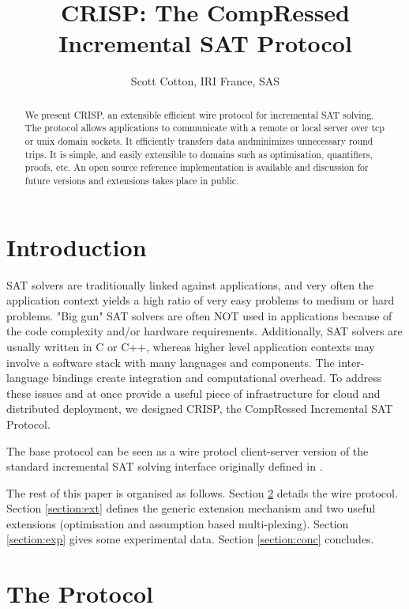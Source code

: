 \documentclass{article}
\begin{document}

\title{CRISP: The CompRessed Incremental SAT Protocol}
\author{Scott Cotton, IRI France, SAS}
\begin{abstract}
We present CRISP, an extensible efficient wire protocol for incremental SAT solving.
The protocol allows applications to communicate with a remote or local server over
tcp or unix domain sockets.  It efficiently transfers data andminimizes unnecessary round
trips.  It is simple, and easily extensible to domains such as optimisation, quantifiers,
proofs, etc.  An open source reference implementation is available and discussion for
future versions and extensions takes place in public.

\end{abstract}
\maketitle
\section{Introduction}
SAT solvers are traditionally linked against applications, and very often the 
application context yields a high ratio of very easy problems to medium or
hard problems.  "Big gun" SAT solvers are often NOT used in applications because
of the code complexity and/or hardware requirements.  Additionally, SAT solvers
are usually written in C or C++, whereas higher level application contexts may involve
a software stack with many languages and components.  The inter-language bindings
create integration and computational overhead.  To address these issues and 
at once provide a useful piece of infrastructure for cloud and distributed deployment,
we designed CRISP, the CompRessed Incremental SAT Protocol. 

The base protocol can be seen as a wire protocl client-server version of the
standard incremental SAT solving interface originally defined in
\cite{DBLP:journals/entcs/EenS03}.

The rest of this paper is organised as follows.  Section \ref{section:protocol}
details the wire protocol.  Section \ref{section:ext} defines the generic
extension mechanism and two useful extensions (optimisation and assumption
based multi-plexing). Section \ref{section:exp} gives some experimental data.
Section \ref{section:conc} concludes.


\section{The Protocol}
\label{section:protocol}
\end{document}
